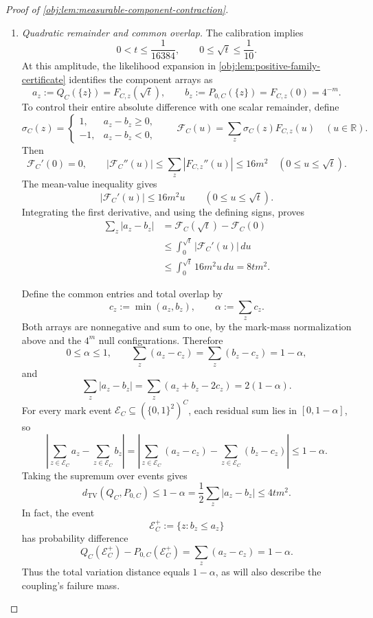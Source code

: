 \documentclass[11pt]{article}
\begin{document}
\begin{proof}[Proof of \cref{obj:lem:measurable-component-contraction}]
\begin{enumerate}
\item \textit{Quadratic remainder and common overlap.}
The calibration implies
\[
0<t\le\frac1{16384},
\qquad
0\le\sqrt t\le\frac1{10}.
\]
At this amplitude, the likelihood expansion in
\cref{obj:lem:positive-family-certificate} identifies the component arrays as
\[
a_z:=Q_C(\{z\})=F_{C,z}(\sqrt t),
\qquad
b_z:=P_{0,C}(\{z\})=F_{C,z}(0)=4^{-m}.
\]
To control their entire absolute difference with one scalar remainder, define
\[
\sigma_C(z)=
\begin{cases}
1,&a_z-b_z\ge0,\\
-1,&a_z-b_z<0,
\end{cases}
\qquad
\mathcal F_C(u)=\sum_z\sigma_C(z)F_{C,z}(u)
\quad(u\in\mathbb R).
\]
Then
\[
\mathcal F_C'(0)=0,
\qquad
|\mathcal F_C''(u)|
\le\sum_z|F_{C,z}''(u)|
\le16m^2
\quad(0\le u\le\sqrt t).
\]
The mean-value inequality gives
\[
|\mathcal F_C'(u)|\le16m^2u
\qquad(0\le u\le\sqrt t).
\]
Integrating the first derivative, and using the defining signs, proves
\[
\begin{aligned}
\sum_z|a_z-b_z|
&=\mathcal F_C(\sqrt t)-\mathcal F_C(0)\\
&\le\int_0^{\sqrt t}|\mathcal F_C'(u)|\,du\\
&\le\int_0^{\sqrt t}16m^2u\,du
=8tm^2.
\end{aligned}
\]

Define the common entries and total overlap by
\[
c_z:=\min(a_z,b_z),
\qquad
\alpha:=\sum_zc_z.
\]
Both arrays are nonnegative and sum to one, by the mark-mass normalization above and the \(4^m\) null configurations. Therefore
\[
0\le\alpha\le1,
\qquad
\sum_z(a_z-c_z)=\sum_z(b_z-c_z)=1-\alpha,
\]
and
\[
\sum_z|a_z-b_z|
=\sum_z(a_z+b_z-2c_z)
=2(1-\alpha).
\]
For every mark event
\(\mathcal E_C\subseteq(\{0,1\}^2)^C\), each residual sum lies in \([0,1-\alpha]\), so
\[
\left|
 \sum_{z\in\mathcal E_C}a_z-\sum_{z\in\mathcal E_C}b_z
\right|
=
\left|
 \sum_{z\in\mathcal E_C}(a_z-c_z)
 -
 \sum_{z\in\mathcal E_C}(b_z-c_z)
\right|
\le1-\alpha.
\]
Taking the supremum over events gives
\[
d_{\mathrm{TV}}(Q_C,P_{0,C})
\le1-\alpha
=\frac12\sum_z|a_z-b_z|
\le4tm^2.
\]
In fact, the event
\[
\mathcal E_C^+:=\{z:b_z\le a_z\}
\]
has probability difference
\[
Q_C(\mathcal E_C^+)-P_{0,C}(\mathcal E_C^+)
=\sum_z(a_z-c_z)=1-\alpha.
\]
Thus the total variation distance equals \(1-\alpha\), as will also describe the coupling's failure mass.


\end{enumerate}
\end{proof}
\end{document}
